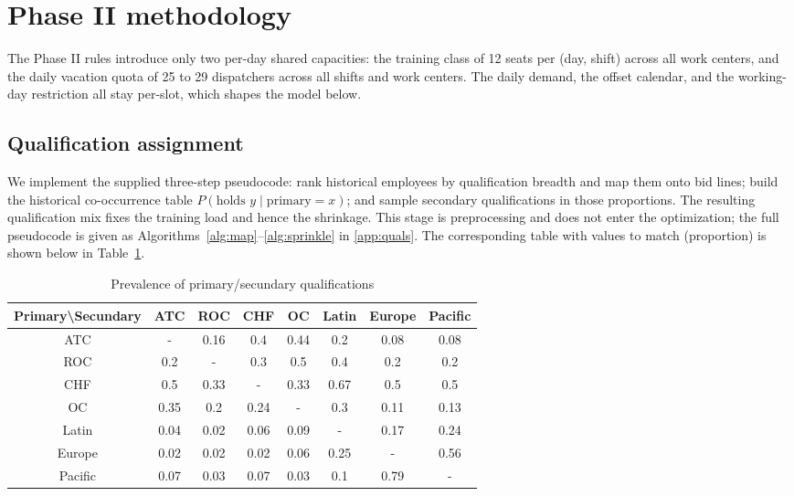 \documentclass[preprint,12pt]{elsarticle}
\begin{document}
\section{Phase II methodology}
   The Phase II rules introduce only two per-day shared capacities: the training class of 12 seats per (day, shift) across all work centers, and the daily vacation quota of 25 to 29 dispatchers across all shifts and work centers. The daily demand, the offset calendar, and the working-day restriction all stay per-slot, which shapes the model below.

   \subsection{Qualification assignment}
   We implement the supplied three-step pseudocode: rank historical employees by qualification breadth and map them onto bid lines; build the historical co-occurrence table $P(\text{holds }y \mid \text{primary}=x)$; and sample secondary qualifications in those proportions. The resulting qualification mix fixes the training load and hence the shrinkage. This stage is preprocessing and does not enter the optimization; the full pseudocode is given as Algorithms~\ref{alg:map}--\ref{alg:sprinkle} in \ref{app:quals}. The corresponding table with values to match (proportion) is shown below in Table~\ref{tab:prevalence_primary_secondary_quals}.

   \begin{table}[h!]
      \centering
      \caption{Prevalence of primary/secundary qualifications}
      \begin{tabular}{c|ccccccc}
      \toprule
      Primary\textbackslash{}Secundary & ATC   & ROC   & CHF   & OC    & Latin & Europe & Pacific \\
      \midrule
      ATC   & -     & 0.16  & 0.4   & 0.44  & 0.2   & 0.08  & 0.08 \\
      ROC   & 0.2   & -     & 0.3   & 0.5   & 0.4   & 0.2   & 0.2 \\
      CHF   & 0.5   & 0.33  & -     & 0.33  & 0.67  & 0.5   & 0.5 \\
      OC    & 0.35  & 0.2   & 0.24  & -     & 0.3   & 0.11  & 0.13 \\
      Latin & 0.04  & 0.02  & 0.06  & 0.09  & -     & 0.17  & 0.24 \\
      Europe & 0.02  & 0.02  & 0.02  & 0.06  & 0.25  & -     & 0.56 \\
      Pacific & 0.07  & 0.03  & 0.07  & 0.03  & 0.1   & 0.79  & - \\
      \bottomrule
      \end{tabular}%
      \label{tab:prevalence_primary_secondary_quals}%
   \end{table}%
\end{document}
